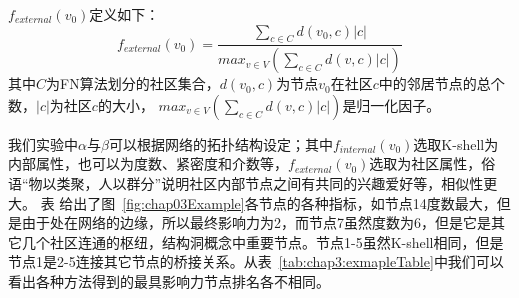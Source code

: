 $f_{external}(v_0)$定义如下：
\begin{equation} 
\label{equ:chap3:KSCexternal}
f_{external}(v_0) = \frac{\sum _{c\in C}d(v_0,c)|c|}{max_{v\in V}(\sum _{c\in C}d(v,c)|c|)}
\end{equation}
其中$C$为FN算法划分的社区集合，$d(v_0,c)$为节点$v_0$在社区$c$中的邻居节点的总个数，$|c|$为社区$c$的大小， $max_{v\in V}(\sum _{c\in C}d(v,c)|c|)$是归一化因子。

我们实验中$\alpha$与$\beta$可以根据网络的拓扑结构设定；其中$f_{internal}(v_0)$选取K-shell为内部属性，也可以为度数、紧密度和介数等，$f_{external}(v_0)$选取为社区属性，俗语“物以类聚，人以群分”说明社区内部节点之间有共同的兴趣爱好等，相似性更大。
表 给出了图~\ref{fig:chap03Example}各节点的各种指标，如节点14度数最大，但是由于处在网络的边缘，所以最终影响力为2，而节点7虽然度数为6，但是它是其它几个社区连通的枢纽，结构洞\cite{burt2004structural,granovetter1973strength}概念中重要节点。节点1-5虽然K-shell相同，但是节点1是2-5连接其它节点的桥接关系。从表~\ref{tab:chap3:exmapleTable}中我们可以看出各种方法得到的最具影响力节点排名各不相同。
